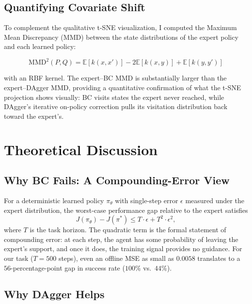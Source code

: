 \documentclass[11pt]{article}
\begin{document}
\subsection{Quantifying Covariate Shift}

To complement the qualitative t-SNE visualization, I computed the
Maximum Mean Discrepancy (MMD) between the state distributions of
the expert policy and each learned policy:

\begin{equation}
\text{MMD}^2(P, Q) = \mathbb{E}[k(x, x')] - 2\mathbb{E}[k(x, y)] + \mathbb{E}[k(y, y')]
\end{equation}

with an RBF kernel. The expert--BC MMD is substantially larger than
the expert--DAgger MMD, providing a quantitative confirmation of
what the t-SNE projection shows visually: BC visits states the expert
never reached, while DAgger's iterative on-policy correction pulls
its visitation distribution back toward the expert's.

\section{Theoretical Discussion}

\subsection{Why BC Fails: A Compounding-Error View}

For a deterministic learned policy $\pi_\theta$ with single-step error
$\epsilon$ measured under the expert distribution, the worst-case
performance gap relative to the expert satisfies
\begin{equation}
J(\pi_\theta) - J(\pi^*) \leq T \cdot \epsilon + T^2 \cdot \epsilon^2,
\end{equation}
where $T$ is the task horizon. The quadratic term is the formal
statement of compounding error: at each step, the agent has some
probability of leaving the expert's support, and once it does, the
training signal provides no guidance. For our task ($T = 500$ steps),
even an offline MSE as small as $0.0058$ translates to a
$56$-percentage-point gap in success rate ($100\%$ vs.\ $44\%$).

\subsection{Why DAgger Helps}
\end{document}
